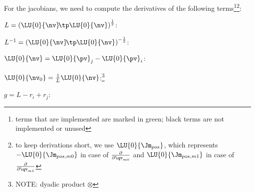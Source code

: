 For the jacobians, we need to compute the derivatives of the following terms\footnote{terms that are implemented are marked in green; black terms are not implemented or unused}\footnote{to keep derivations short, we use $\LU{0}{\Jm_{pos}}$, which represents $-\LU{0}{\Jm_{pos,m0}}$ in case of 
$\frac{\partial }{\partial \qv_{m0}}$ and $\LU{0}{\Jm_{pos,m1}}$ in case of $\frac{\partial }{\partial \qv_{m1}}$   }:
\bi
  \item $L = \left(\LU{0}{\nv}\!\tp\LU{0}{\nv}\right)^\frac{1}{2}$:
  \be
  \ee
  \item $L^{-1} = \left(\LU{0}{\nv}\!\tp\LU{0}{\nv}\right)^{-\frac{1}{2}}$:
  \be
  \ee
  \item $\LU{0}{\nv} = \LU{0}{\pv}_{j} - \LU{0}{\pv}_{i}$:
  \be
  \ee
  \item $\LU{0}{\nv_0} = \frac{1}{L} \LU{0}{\nv}$:\footnote{NOTE: 
  dyadic product $\otimes$}
  \be
  \ee
  \item $g = L - r_i + r_j$:
  \be
  \ee
